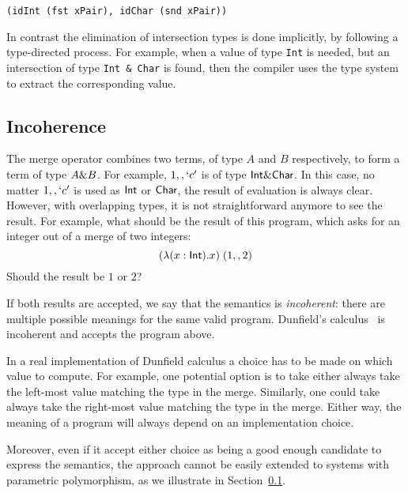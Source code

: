 \begin{lstlisting}
(idInt (fst xPair), idChar (snd xPair))
\end{lstlisting}

\noindent In contrast the elimination of intersection types is done
implicitly, by following a type-directed process. For example, 
when a value of type \lstinline{Int} is needed, but an intersection
of type \lstinline{Int & Char} is found, then the compiler uses the
type system to extract the corresponding value. 

\subsection{Incoherence}
The merge operator combines two terms, of type $A$ and $B$
respectively, to form a term of type $A \& B$. For example,
$1 ,, `c'$ is of type $\textsf{Int} \& \textsf{Char}$. In this case, no
matter $1 ,, `c'$ is used as $\textsf{Int}$ or $\textsf{Char}$, the result
of evaluation is always clear. However, with overlapping types, it is
not straightforward anymore to see the result. For example, what
should be the result of this program, which asks for an integer out of
a merge of two integers:
\[ (\lambda (x : \textsf{Int}). x) \; (1 ,, 2) \]
Should the result be $1$ or $2$?

If both results are accepted, we say that the semantics is
\emph{incoherent}: there are multiple possible meanings for the same
valid program. Dunfield's calculus~\cite{} is incoherent and accepts the
program above. 

In a real implementation of Dunfield calculus a choice has to be made
on which value to compute. For example, one potential option is to
take either always take the left-most value matching the type in the
merge. Similarly, one could take always take the right-most
value matching the type in the merge. Either way, the meaning
of a program will always depend on an implementation choice.

Moreover, even if it accept either choice as being a good enough
candidate to express the semantics, the approach cannot be easily
extended to systems with parametric polymorphism, as we illustrate 
in Section~\ref{}.


